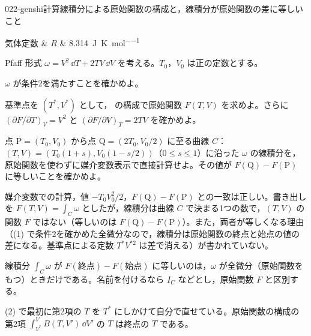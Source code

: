 \documentclass[uplatex,dvipdfmx,a4paper,11pt]{jsarticle}
\begin{document}
\begin{mondai}{022-genshi}{計算}{線積分による原始関数の構成と，線積分が原始関数の差に等しいこと}
\begin{teisuu}
  気体定数 & $R$ & \qty{8.314}{\joule\per\kelvin\per\mole}\\
\end{teisuu}
Pfaff 形式 $\omega = V^{2}\,\dd T + 2TV\,\dd V$ を考える。$T_{0}$，$V_{0}$ は正の定数とする。
  \begin{shoumon}
    \item $\omega$ が条件2を満たすことを確かめよ。
    \item 基準点を $(T^{*},V^{*})$ として， の構成で原始関数 $F(T,V)$ を求めよ。さらに $(\partial F/\partial T)_{V} = V^{2}$ と $(\partial F/\partial V)_{T} = 2TV$ を確かめよ。
    \item 点 $\mathrm{P} = (T_{0},V_{0})$ から点 $\mathrm{Q} = (2T_{0},V_{0}/2)$ に至る曲線 $C$：$(T,V) = (T_{0}(1+s),V_{0}(1-s/2))$（$0 \le s \le 1$）に沿った $\omega$ の線積分を，原始関数を使わずに媒介変数表示で直接計算せよ。その値が $F(\mathrm{Q}) - F(\mathrm{P})$ に等しいことを確かめよ。
  \end{shoumon}

\begin{kotaeran}
   媒介変数での計算，値 $-T_{0}V_{0}^{2}/2$，$F(\mathrm{Q})-F(\mathrm{P})$ との一致は正しい。書き出しを $F(T,V)=\int_{C}\omega$ としたが，線積分は曲線 $C$ で決まる1つの数で，$(T,V)$ の関数 $F$ ではない（等しいのは $F(\mathrm{Q})-F(\mathrm{P})$）。また，両者が等しくなる理由（(1) で条件2を確かめた全微分なので，線積分は原始関数の終点と始点の値の差になる。基準点による定数 $T^{*}V^{*2}$ は差で消える）が書かれていない。
\end{kotaeran}
\begin{rikai}
  \item 線積分 $\int_{C}\omega$ が $F(\text{終点})-F(\text{始点})$ に等しいのは，$\omega$ が全微分（原始関数をもつ）ときだけである。名前を付けるなら $I_{C}$ などとし，原始関数 $F$ と区別する。
  \item (2) で最初に第2項の $T$ を $T^{*}$ にしかけて自分で直せている。原始関数の構成の第2項 $\int_{V^{*}}^{V}B(T,V')\,\dd V'$ の $T$ は終点の $T$ である。
\end{rikai}
\end{mondai}
\end{document}

